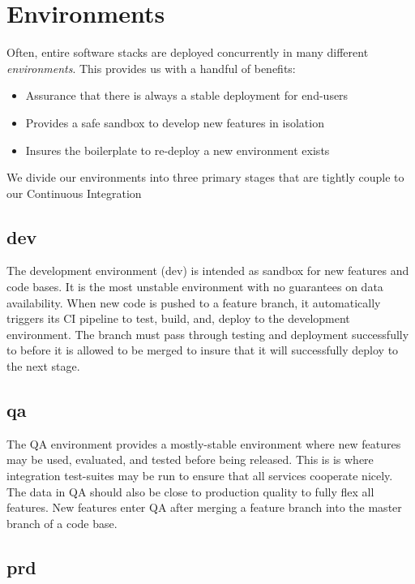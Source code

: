 \documentclass[a4paper,12pt,titlepage]{scrartcl}
\begin{document}
	\section{Environments}
	
	Often, entire software stacks are deployed concurrently in many different {\em environments}. This provides us with a handful of benefits:
	
	\begin{itemize}  
	\item Assurance that there is always a stable deployment for end-users
	\item Provides a safe sandbox to develop new features in isolation
	\item Insures the boilerplate to re-deploy a new environment exists
	\end{itemize}
	
	We divide our environments into three primary stages that are tightly couple to our Continuous Integration
	
	\subsection{dev}
	
	The development environment (dev) is intended as sandbox for  new features and code bases.
	It is the most unstable environment with no guarantees on data availability.
	When new code is pushed to a feature branch, it automatically triggers its CI pipeline to test, build, and, deploy to the development environment.
	The branch must pass through testing and deployment successfully to before it is allowed to be merged to insure that it will successfully deploy to the next stage.
	
	\subsection{qa}
	
	The QA environment provides a mostly-stable environment where new features may be used, evaluated, and tested before being released.
	This is is where integration test-suites may be run to ensure that all services cooperate nicely.
	The data in QA should also be close to production quality to fully flex all features.
	New features enter QA after merging a feature branch into the master branch of a code base.
	
	\subsection{prd}
	
\end{document}
